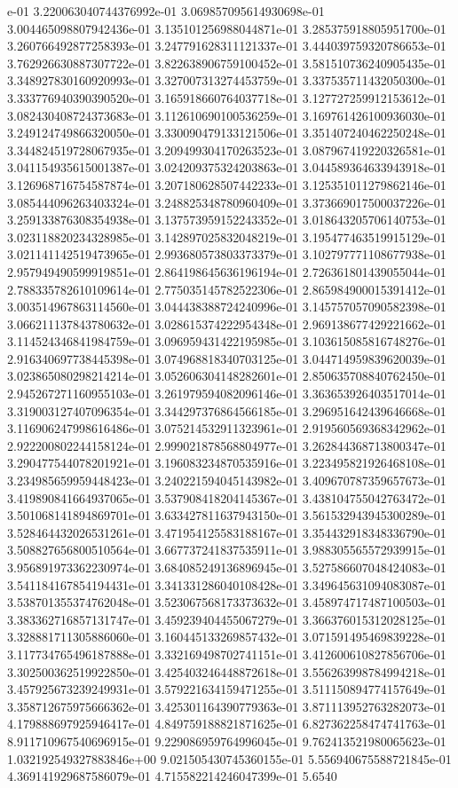 e-01	3.220063040744376992e-01	3.069857095614930698e-01	3.004465098807942436e-01	3.135101256988044871e-01	3.285375918805951700e-01	3.260766492877258393e-01	3.247791628311121337e-01	3.444039759320786653e-01	3.762926630887307722e-01	3.822638906759100452e-01	3.581510736240905435e-01	3.348927830160920993e-01	3.327007313274453759e-01	3.337535711432050300e-01	3.333776940390390520e-01	3.165918660764037718e-01	3.127727259912153612e-01	3.082430408724373683e-01	3.112610690100536259e-01	3.169761426100936030e-01	3.249124749866320050e-01	3.330090479133121506e-01	3.351407240462250248e-01	3.344824519728067935e-01	3.209499304170263523e-01	3.087967419220326581e-01	3.041154935615001387e-01	3.024209375324203863e-01	3.044589364633943918e-01	3.126968716754587874e-01	3.207180628507442233e-01	3.125351011279862146e-01	3.085444096263403324e-01	3.248825348780960409e-01	3.373669017500037226e-01	3.259133876308354938e-01	3.137573959152243352e-01	3.018643205706140753e-01	3.023118820234328985e-01	3.142897025832048219e-01	3.195477463519915129e-01	3.021141142519473965e-01	2.993680573803373379e-01	3.102797771108677938e-01	2.957949490599919851e-01	2.864198645636196194e-01	2.726361801439055044e-01	2.788335782610109614e-01	2.775035145782522306e-01	2.865984900015391412e-01	3.003514967863114560e-01	3.044438388724240996e-01	3.145757057090582398e-01	3.066211137843780632e-01	3.028615374222954348e-01	2.969138677429221662e-01	3.114524346841984759e-01	3.096959431422195985e-01	3.103615085816748276e-01	2.916340697738445398e-01	3.074968818340703125e-01	3.044714959839620039e-01	3.023865080298214214e-01	3.052606304148282601e-01	2.850635708840762450e-01	2.945267271160955103e-01	3.261979594082096146e-01	3.363653926403517014e-01	3.319003127407096354e-01	3.344297376864566185e-01	3.296951642439646668e-01	3.116906247998616486e-01	3.075214532911323961e-01	2.919560569368342962e-01	2.922200802244158124e-01	2.999021878568804977e-01	3.262844368713800347e-01	3.290477544078201921e-01	3.196083234870535916e-01	3.223495821926468108e-01	3.234985659959448423e-01	3.240221594045143982e-01	3.409670787359657673e-01	3.419890841664937065e-01	3.537908418204145367e-01	3.438104755042763472e-01	3.501068141894869701e-01	3.633427811637943150e-01	3.561532943945300289e-01	3.528464432026531261e-01	3.471954125583188167e-01	3.354432918348336790e-01	3.508827656800510564e-01	3.667737241837535911e-01	3.988305565572939915e-01	3.956891973362230974e-01	3.684085249136896945e-01	3.527586607048424083e-01	3.541184167854194431e-01	3.341331286040108428e-01	3.349645631094083087e-01	3.538701355374762048e-01	3.523067568173373632e-01	3.458974717487100503e-01	3.383362716857131747e-01	3.459239404455067279e-01	3.366376015312028125e-01	3.328881711305886060e-01	3.160445133269857432e-01	3.071591495469839228e-01	3.117734765496187888e-01	3.332169498702741151e-01	3.412600610827856706e-01	3.302500362519922850e-01	3.425403246448872618e-01	3.556263998784994218e-01	3.457925673239249931e-01	3.579221634159471255e-01	3.511150894774157649e-01	3.358712675975666362e-01	3.425301164390779363e-01	3.871113952763282073e-01	4.179888697925946417e-01	4.849759188821871625e-01	6.827362258474741763e-01	8.911710967540696915e-01	9.229086959764996045e-01	9.762413521980065623e-01	1.032192549327883846e+00	9.021505430745360155e-01	5.556940675588721845e-01	4.369141929687586079e-01	4.715582214246047399e-01	5.6540